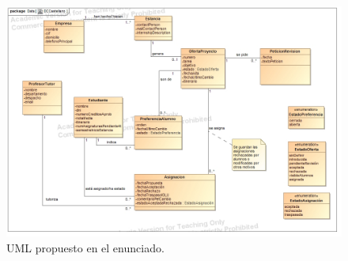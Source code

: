 \documentclass[pdftex,11pt,a4paper]{book}
\begin{document}
\begin{figure}[h]
\begin{center}
\includegraphics[width=\textwidth]{img/uml_enunciado.jpg}
\caption{\label{uml_enunciado} UML propuesto en el enunciado\cite{caspractic}.}
\end{center}
\end{figure}
\end{document}
